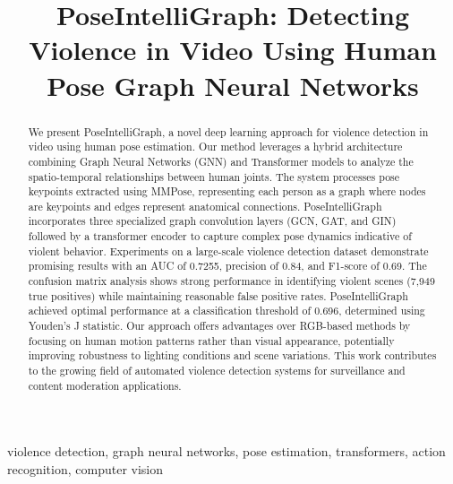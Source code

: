 \documentclass[conference]{IEEEtran}
\begin{document}
\title{PoseIntelliGraph: Detecting Violence in Video Using Human Pose Graph Neural Networks\\
}

\author{
}

\maketitle

\begin{abstract}
    We present PoseIntelliGraph, a novel deep learning approach for violence detection in video using human pose estimation. Our method leverages a hybrid architecture combining Graph Neural Networks (GNN) and Transformer models to analyze the spatio-temporal relationships between human joints. The system processes pose keypoints extracted using MMPose, representing each person as a graph where nodes are keypoints and edges represent anatomical connections. PoseIntelliGraph incorporates three specialized graph convolution layers (GCN, GAT, and GIN) followed by a transformer encoder to capture complex pose dynamics indicative of violent behavior. Experiments on a large-scale violence detection dataset demonstrate promising results with an AUC of 0.7255, precision of 0.84, and F1-score of 0.69. The confusion matrix analysis shows strong performance in identifying violent scenes (7,949 true positives) while maintaining reasonable false positive rates. PoseIntelliGraph achieved optimal performance at a classification threshold of 0.696, determined using Youden's J statistic. Our approach offers advantages over RGB-based methods by focusing on human motion patterns rather than visual appearance, potentially improving robustness to lighting conditions and scene variations. This work contributes to the growing field of automated violence detection systems for surveillance and content moderation applications.
\end{abstract}

\begin{IEEEkeywords}
    violence detection, graph neural networks, pose estimation, transformers, action recognition, computer vision
\end{IEEEkeywords}
\end{document}
